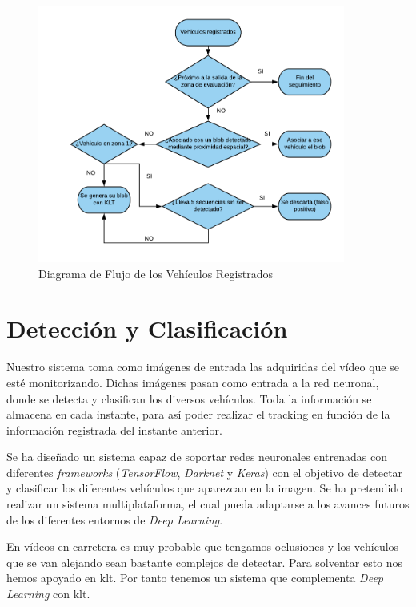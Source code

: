 \begin{figure}[H] 
\begin{center}
	\includegraphics[width=0.9\textwidth]{figures/Diseno_global/diagrama_flujo1.png}
   \caption{Diagrama de Flujo de  los Vehículos Registrados}
	\label{fig.diagrama_flujo_vehiculos}
\end{center}
\end{figure}

\section{Detección y Clasificación}

Nuestro sistema toma como imágenes de entrada las adquiridas del vídeo que se esté monitorizando. Dichas imágenes pasan como entrada a la red neuronal, donde se detecta y clasifican los diversos vehículos. Toda la información se almacena en cada instante, para así poder realizar el tracking en función de la información registrada del instante anterior.

Se ha diseñado un sistema capaz de soportar redes neuronales entrenadas con diferentes \textit{frameworks} (\textit{TensorFlow}, \textit{Darknet} y \textit{Keras}) con el objetivo de detectar y clasificar los diferentes vehículos que aparezcan en la imagen. Se ha pretendido realizar un sistema multiplataforma, el cual pueda adaptarse a los avances futuros de los diferentes entornos de \textit{Deep Learning}. 

En vídeos en carretera es muy probable que tengamos oclusiones y los vehículos que se van alejando sean bastante complejos de detectar. Para solventar esto nos hemos apoyado en \acrfull{klt}. Por tanto tenemos un sistema que complementa \textit{Deep Learning} con \acrshort{klt}. 

